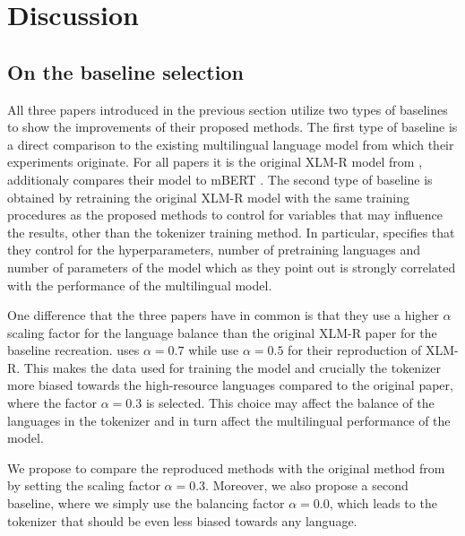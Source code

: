 
\chapter{Discussion}



\section{On the baseline selection}

All three papers introduced in the previous section utilize two types of baselines to show the improvements of their proposed methods. The first type of baseline is a direct comparison to the existing multilingual language model from which their experiments originate. For all papers it is the original XLM-R model from \citet{conneau_unsupervised_2020}, \citet{chung_improving_2020} additionaly compares their model to mBERT \cite{devlin_bert_2019}. The second type of baseline is obtained by retraining the original XLM-R model with the same training procedures as the proposed methods to control for variables that may influence the results, other than the tokenizer training method. In particular, \citet{chung_improving_2020} specifies that they control for the hyperparameters, number of pretraining languages and number of parameters of the model which as they point out is strongly correlated with the performance of the multilingual model. \cite{conneau_unsupervised_2020}

One difference that the three papers have in common is that they use a higher $\alpha$ scaling factor for the language balance than the original XLM-R paper for the baseline recreation. \citet{zheng_allocating_2021} uses $\alpha=0.7$ while \citet{chung_improving_2020,liang_xlm-v_2023} use $\alpha=0.5$ for their reproduction of XLM-R. This makes the data used for training the model and crucially the tokenizer more biased towards the high-resource languages compared to the original paper, where the factor $\alpha=0.3$ is selected. This choice may affect the balance of the languages in the tokenizer and in turn affect the multilingual performance of the model.

We propose to compare the reproduced methods with the original method from \citet{conneau_unsupervised_2020} by setting the scaling factor $\alpha=0.3$. Moreover, we also propose a second baseline, where we simply use the balancing factor $\alpha=0.0$, which leads to the tokenizer that should be even less biased towards any language. 



